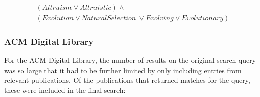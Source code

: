 \documentclass[a4paper]{book}
\begin{document}
\begin{appendices}
			\begin{center}
			\begin{multline}
			\label{eq:search2}
			(Altruism \lor Altruistic ) \land \\
				(Evolution \lor Natural Selection\ \lor Evolving \lor Evolutionary)
				\end{multline}
				\end{center}

				\subsubsection{ACM Digital Library}
				For the ACM Digital Library, the number of results on the original search query
				was so large that it had to be further limited by only including entries from 
				relevant publications. Of the publications that returned matches for the query,
				these were included in the final search:

				\begin{itemize}


\end{itemize}
\end{appendices}
\end{document}
